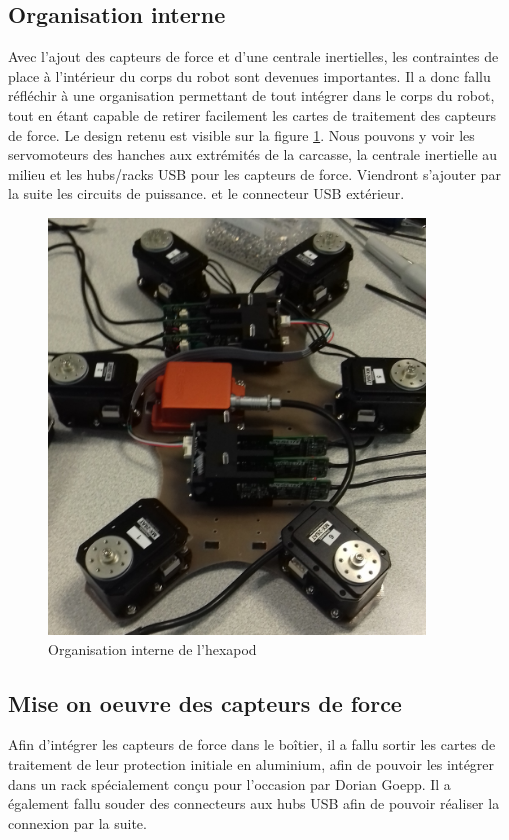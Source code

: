 \documentclass{tnreport}
\begin{document}
\subsection{Organisation interne}
Avec l'ajout des capteurs de force et d'une centrale inertielles, les contraintes de place à l'intérieur du corps du robot sont devenues importantes. Il a donc fallu réfléchir à une organisation permettant de tout intégrer dans le corps du robot, tout en étant capable de retirer facilement les cartes de traitement des capteurs de force. Le design retenu est visible sur la figure \ref{fig:layout}. Nous pouvons y voir les servomoteurs des hanches aux extrémités de la carcasse, la centrale inertielle au milieu et les hubs/racks USB pour les capteurs de force. Viendront s'ajouter par la suite les circuits de puissance. et le connecteur USB extérieur.  

\begin{figure}
    \centering
    \includegraphics[width=10cm]{figures/layout}
    \caption{Organisation interne de l'hexapod}
    \label{fig:layout}
\end{figure}

\subsection{Mise on oeuvre des capteurs de force}
Afin d'intégrer les capteurs de force dans le boîtier, il a fallu sortir les cartes de traitement de leur protection initiale en aluminium, afin de pouvoir les intégrer dans un rack spécialement conçu pour l'occasion par Dorian Goepp. Il a également fallu souder des connecteurs aux hubs USB afin de pouvoir réaliser la connexion par la suite. 
\end{document}
